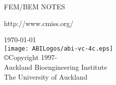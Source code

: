 \thispagestyle{empty}

\begin{center}
   \huge FEM/BEM NOTES
   \vspace{10mm}   

   \large http://www.cmiss.org/

   \vspace{60mm}   
   \today\\   %

   \large
   \vspace{60mm}
      \texttt{[image: ABILogos/abi-vc-4c.eps]}\\

    \vspace{15mm}
   \small
   \copyright \thickspace Copyright 1997-\\
   Auckland Bioengineering Institute\\
   The University of Auckland
\end{center}





